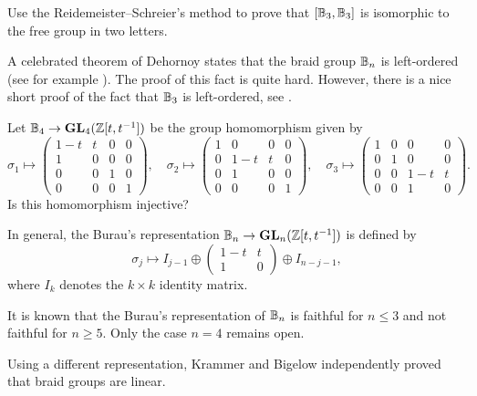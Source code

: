 \begin{exercise}
\label{xca:derivedB3}
    Use the Reidemeister--Schreier's method to prove that 
    $[\mathbb{B}_3,\mathbb{B}_3]$ is isomorphic to the free group in two letters.
\end{exercise}

A celebrated theorem of Dehornoy states that the braid group $\mathbb{B}_n$ 
is left-ordered (see for example \cite[Theorem 7.15]{MR2435235}). The proof of this fact is quite hard. However, 
there is a nice short proof of the fact that 
$\mathbb{B}_3$ is left-ordered, see 
\cite[\S7.2]{MR3560661}.

\begin{problem}
    Let $\mathbb{B}_4\to\mathbf{GL}_4(\mathbb{Z}[t,t^{-1}])$ be the group 
    homomorphism given by
    \[
    \sigma_1\mapsto\begin{pmatrix}
    1-t&t&0&0\\
    1&0&0&0\\
    0&0&1&0\\
    0&0&0&1
    \end{pmatrix},
    \quad
    \sigma_2\mapsto\begin{pmatrix}
    1&0&0&0\\
    0&1-t&t&0\\
    0&1&0&0\\
    0&0&0&1
    \end{pmatrix},
    \quad
    \sigma_3\mapsto\begin{pmatrix}
    1&0&0&0\\
    0&1&0&0\\
    0&0&1-t&t\\
    0&0&1&0
    \end{pmatrix}.
    \]
    Is this homomorphism injective?
\end{problem}

In general, the Burau's representation
$\mathbb{B}_n\to\mathbf{GL}_{n}(\mathbb{Z}[t,t^{-1}])$ 
is defined
by
\[
\sigma_j\mapsto
I_{j-1}\oplus
\begin{pmatrix}
1-t & t\\
1 & 0
\end{pmatrix}
\oplus
I_{n-j-1},
\]
where $I_k$ denotes the $k\times k$ identity matrix. 

It is known that the Burau's representation of $\mathbb{B}_n$ is faithful
for $n\leq3$ and not faithful for $n\geq5$. Only the case
$n=4$ remains open.

Using a different representation,  
Krammer \cite{MR1888796} and Bigelow \cite{MR1815219} 
independently proved that braid groups are linear. 

